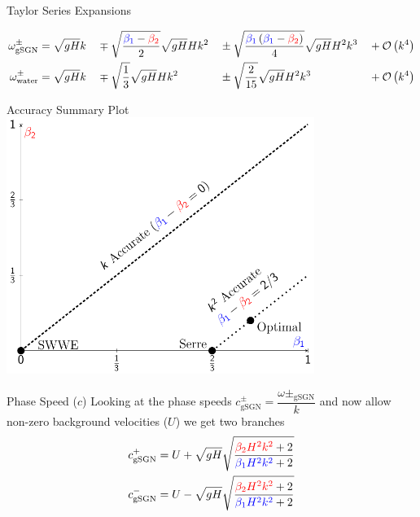 \documentclass[pdf]{beamer}
\begin{document}
\begin{frame}{Taylor Series Expansions}

{\footnotesize
\begin{align*}
\omega^{\pm}_{\text{gSGN}} & = \sqrt{gH} k &&\mp \sqrt{\frac{ {\color{blue}\beta_1} - {\color{red}\beta_2}  }{2}} \sqrt{gH} H  k^2 &&\pm  \sqrt{\frac{{\color{blue}\beta_1}\left({\color{blue}\beta_1}- {\color{red}\beta_2}\right) }{4}}  \sqrt{gH} H^2 k^3 &&+ \mathcal{O}\left(k^4\right)\\
\omega^{\pm}_{\text{water}} & = \sqrt{gH} k &&\mp \sqrt{\frac{1}{3}} \sqrt{gH} H k^2   &&\pm  \sqrt{\frac{2}{15}}\sqrt{gH} H^2 k^3  &&+ \mathcal{O}\left(k^4\right) 
\end{align*}}
\end{frame}


\begin{frame}{Accuracy Summary Plot}
\centering
	\includegraphics[width=0.75\textwidth]{./Pics/Tex/Explanatory/RegionsPlot/AccuracySummary.pdf}
\end{frame}

\begin{frame}{Phase Speed ($c$)}
Looking at the phase speeds  $c^\pm_{\text{gSGN}} = \dfrac{\omega\pm_{\text{gSGN}}}{k}$
and now allow non-zero background velocities ($U$) we get two branches
\begin{align*}
c^+_{\text{gSGN}} &= U + \sqrt{gH} \sqrt{ \dfrac{{\color{red}\beta_2 H^2 k^2} + 2}{ {\color{blue}\beta_1 H^2 k^2} + 2}} \\
c^-_{\text{gSGN}} &= U - \sqrt{gH} \sqrt{ \dfrac{{\color{red}\beta_2 H^2 k^2} + 2}{ {\color{blue}\beta_1 H^2 k^2} + 2}}
\end{align*}
\end{frame}
\end{document}
